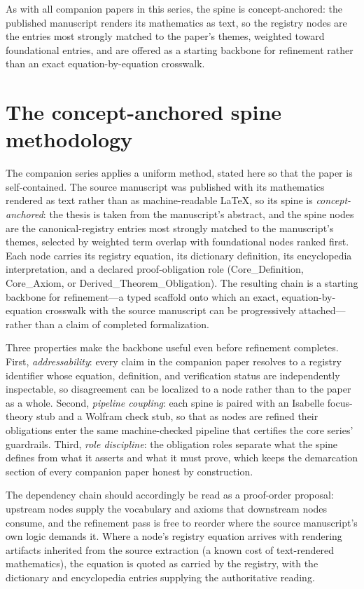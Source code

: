 \documentclass[11pt]{article}
\theoremstyle{remark}
\begin{document}
As with all companion papers in this series, the spine is concept-anchored: the published manuscript renders its mathematics as text, so the registry nodes are the entries most strongly matched to the paper's themes, weighted toward foundational entries, and are offered as a starting backbone for refinement rather than an exact equation-by-equation crosswalk.

\section{The concept-anchored spine methodology}
\label{sec:method}

The companion series applies a uniform method, stated here so that the paper is self-contained. The source manuscript was published with its mathematics rendered as text rather than as machine-readable LaTeX, so its spine is \emph{concept-anchored}: the thesis is taken from the manuscript's abstract, and the spine nodes are the canonical-registry entries most strongly matched to the manuscript's themes, selected by weighted term overlap with foundational nodes ranked first. Each node carries its registry equation, its dictionary definition, its encyclopedia interpretation, and a declared proof-obligation role (Core\_Definition, Core\_Axiom, or Derived\_Theorem\_Obligation). The resulting chain is a starting backbone for refinement---a typed scaffold onto which an exact, equation-by-equation crosswalk with the source manuscript can be progressively attached---rather than a claim of completed formalization.

Three properties make the backbone useful even before refinement completes. First, \emph{addressability}: every claim in the companion paper resolves to a registry identifier whose equation, definition, and verification status are independently inspectable, so disagreement can be localized to a node rather than to the paper as a whole. Second, \emph{pipeline coupling}: each spine is paired with an Isabelle focus-theory stub and a Wolfram check stub, so that as nodes are refined their obligations enter the same machine-checked pipeline that certifies the core series' guardrails. Third, \emph{role discipline}: the obligation roles separate what the spine defines from what it asserts and what it must prove, which keeps the demarcation section of every companion paper honest by construction.

The dependency chain should accordingly be read as a proof-order proposal: upstream nodes supply the vocabulary and axioms that downstream nodes consume, and the refinement pass is free to reorder where the source manuscript's own logic demands it. Where a node's registry equation arrives with rendering artifacts inherited from the source extraction (a known cost of text-rendered mathematics), the equation is quoted as carried by the registry, with the dictionary and encyclopedia entries supplying the authoritative reading.
\end{document}
